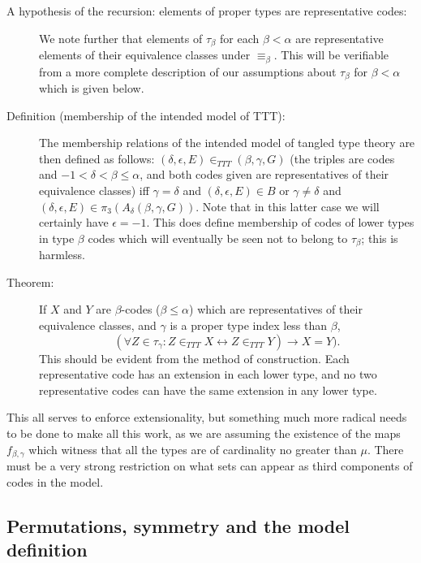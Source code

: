 \documentclass[112pt]{article}
\begin{document}
\begin{description}
\item[A hypothesis of the recursion:  elements of proper types are representative codes:]

We note further that elements of $\tau_\beta$ for each $\beta<\alpha$ are representative elements of their equivalence classes under $\equiv_\beta$.  This will be verifiable from a more complete description of our assumptions about $\tau_\beta$ for $\beta<\alpha$ which is given below.

\item[Definition (membership of the intended model of TTT):]  The membership relations of the intended model of tangled type theory are then defined as follows: $(\delta,\epsilon,E) \in_{TTT} (\beta,\gamma,G)$ (the triples are codes and $-1<\delta<\beta \leq \alpha$, and both codes given are representatives of their equivalence classes) iff $\gamma=\delta$ and
$(\delta,\epsilon,E)  \in B$ or $\gamma\neq \delta$ and $(\delta,\epsilon,E) \in \pi_3(A_{\delta}(\beta,\gamma,G))$.  Note that in this latter case we will certainly have $\epsilon=-1$.  This does define membership of codes of lower types in
type $\beta$ codes which will eventually be seen not to belong to $\tau_\beta$;  this is harmless.

\item[Theorem:]  If $X$ and $Y$ are $\beta$-codes ($\beta \leq \alpha$) which are representatives of their equivalence classes, and $\gamma$ is a proper type index less than $\beta$,
$$(\forall Z \in \tau_\gamma: Z \in_{TTT} X \leftrightarrow Z \in_{TTT} Y) \rightarrow X = Y).$$  This should be evident from the method of construction.   Each representative code has an extension in each lower type, and no two representative codes can have the same extension in any lower type.

\end{description}

This all serves to enforce extensionality, but something much more radical needs to be done to make all this work, as we are assuming the existence of the maps $f_{\beta,\gamma}$ which witness that all the types are of cardinality no greater than $\mu$.  There must be a very strong restriction on what sets can appear as third components of codes in the model.

\subsection{Permutations, symmetry and the model definition}
\end{document}
